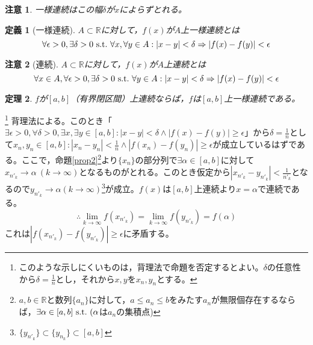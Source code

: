 \documentclass[dvipdfmx,a4j,10pt]{jsarticle}
\makeatletter
\theoremstyle{mystyle1}
\newtheorem{dfn}{定義}[part]
\newtheorem{thm}[dfn]{定理}
\theoremstyle{mystyle2}
\newtheorem{note}{注意}
\renewenvironment{proof}[1][\proofname]{\par
  \pushQED{\qed}%
  \normalfont
  \topsep6\p@\@plus6\p@ \trivlist
  \item[\hskip\labelsep{\bfseries\sffamily #1}]\ignorespaces
}{%
  \popQED\endtrivlist\@endpefalse
}
\renewcommand\proofname{証明}
\makeatother
\begin{document}
\begin{note}
    一様連続はこの幅$\delta$が$x$によらずとれる。
\end{note}

\begin{framed}
    \begin{dfn}[一様連続]
    $A\subset\mathbb{R}$\footnotemark に対して，$f(x)$が$A$上一様連続とは
    \[
    \forall\epsilon>0,\exists\delta>0\ {\rm s.t.}\ \forall x,\forall y\in A:|x-y|<\delta\Rightarrow |f(x)-f(y)|<\epsilon
    \]
    \end{dfn}
\end{framed}
\begin{framed}
    \begin{note}[連続]
    $A\subset\mathbb{R}$\footnotemark に対して，$f(x)$が$A$上連続とは
    \[
    \forall x\in A,\forall\epsilon>0,\exists\delta>0\ {\rm s.t.}\ \forall y\in A:|x-y|<\delta\Rightarrow |f(x)-f(y)|<\epsilon
    \]
    \end{note}
\end{framed}

\newpage

\begin{framed}
\begin{thm}\label{thm5.6}
$f$が$[a,b]$（有界閉区間）上連続ならば，$f$は$[a,b]$上一様連続である。
\end{thm}
\end{framed}

\begin{proof}[定理\ref{thm5.6}の証明]
\footnote{
このような示しにくいものは，背理法で命題を否定するとよい。$\delta$の任意性から$\delta=\frac{1}{n}$とし，それから$x,y$を$x_n,y_n$とする。
}
    背理法による。このとき「$\exists\epsilon>0,\forall\delta>0,\exists x,\exists y\in[a,b]:|x-y|<\delta\land |f(x)-f(y)|\geq\epsilon$」から$\displaystyle\delta=\frac{1}{n}$として$\displaystyle x_n,y_n\in[a,b]:|x_n-y_n|<\frac{1}{n}\land |f(x_n)-f(y_n)|\geq\epsilon$が成立しているはずである。ここで，命題\ref{prop2}\footnote{$a,b\in\mathbb{R}$と数列$\{a_n\}$に対して，$a\leq a_n\leq b$をみたす$a_n$が無限個存在するならば，$\exists\alpha\in[a,b]\ {\rm s.t.}\ (\alpha$は$a_n$の集積点)}より$\{x_n\}$の部分列で$\exists\alpha\in[a,b]$に対して$x_{n'_k}\to\alpha\ (k\to\infty)$となるものがとれる。このとき仮定から$\displaystyle \left|x_{n'_k}-y_{n'_k}\right|<\frac{1}{n'_k}$となるので$y_{n'_k}\to\alpha(k\to\infty)$\footnote{$\{y_{n'_k}\} \subset \{y_{n_k}\}\subset [a,b]$}$が成立。f(x)$は$[a,b]$上連続より$x=\alpha$で連続である。
    \[\therefore \lim_{k\to\infty}f(x_{n'_k})=\lim_{k\to\infty}f(y_{n'_k})=f(\alpha)\]
    これは$\left|f(x_{n'_k})-f(y_{n'_k})\right|\geq\epsilon$に矛盾する。
\end{proof}
\end{document}
